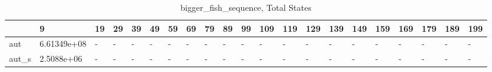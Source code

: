 \begin{table}
\caption{bigger_fish_sequence, Total States}
\label{bigger_fish_sequence_total}
\begin{tabular}{lllllllllllllllllllll}
\toprule
 & 9 & 19 & 29 & 39 & 49 & 59 & 69 & 79 & 89 & 99 & 109 & 119 & 129 & 139 & 149 & 159 & 169 & 179 & 189 & 199 \\
\midrule
aut & 6.61349e+08 & - & - & - & - & - & - & - & - & - & - & - & - & - & - & - & - & - & - & - \\
aut_s & 2.5088e+06 & - & - & - & - & - & - & - & - & - & - & - & - & - & - & - & - & - & - & - \\
\bottomrule
\end{tabular}
\end{table}
